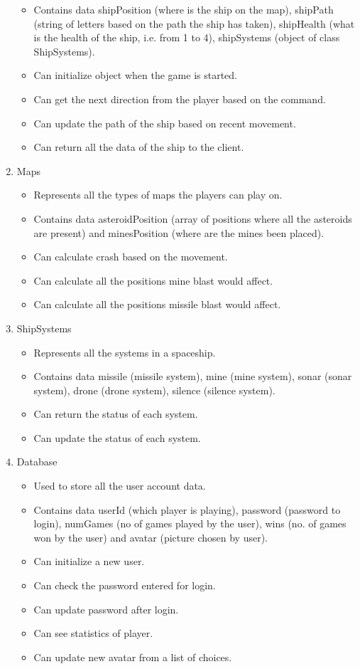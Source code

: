 \begin{enumerate}
\begin{itemize}
\item Contains data shipPosition (where is the ship on the map), shipPath (string of letters based on the path the ship has taken), shipHealth (what is the health of the ship, i.e. from 1 to 4), shipSystems (object of class ShipSystems).
\item Can initialize object when the game is started.
\item Can get the next direction from the player based on the command.
\item Can update the path of the ship based on recent movement.
\item Can return all the data of the ship to the client.
\end{itemize}
\item Maps
\begin{itemize}
\item Represents all the types of maps the players can play on.
\item Contains data asteroidPosition (array of positions where all the asteroids are present) and minesPosition (where are the mines been placed).
\item Can calculate crash based on the movement.
\item Can calculate all the positions mine blast would affect.
\item Can calculate all the positions missile blast would affect.
\end{itemize}
\item ShipSystems
\begin{itemize}
\item Represents all the systems in a spaceship.
\item Contains data missile (missile system), mine (mine system), sonar (sonar system), drone (drone system), silence (silence system).
\item Can return the status of each system.
\item Can update the status of each system.
\end{itemize}
\item Database
\begin{itemize}
\item Used to store all the user account data.
\item Contains data userId (which player is playing), password (password to login), numGames (no of games played by the user), wins (no. of games won by the user) and avatar (picture chosen by user).
\item Can initialize a new user.
\item Can check the password entered for login.
\item Can update password after login.
\item Can see statistics of player.
\item Can update new avatar from a list of choices.
\end{itemize}
\end{enumerate}

